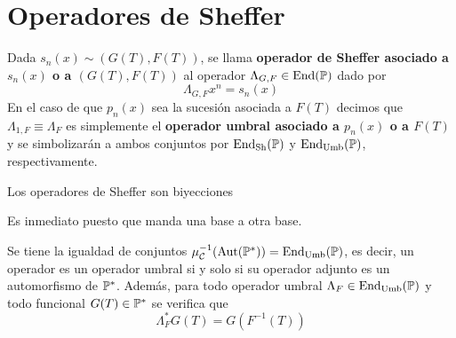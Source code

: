 
\section{Operadores de Sheffer}

\begin{definicion}
    Dada $s_n(x) \sim (G(T), F(T))$, se llama \textbf{operador de Sheffer asociado a $s_n(x)$ o a $(G(T), F(T))$} al operador $\Lambda_{G,F} \in \operatorname*{End}(\mathbb{P})$ dado por
    \begin{equation*}
        \Lambda_{G,F} x^n = s_n(x)
    \end{equation*}
    En el caso de que $p_n(x)$ sea la sucesión asociada a $F(T)$ decimos que $\Lambda_{1, F} \equiv \Lambda_{F}$ es simplemente el \textbf{operador umbral asociado a $p_n(x) $ o a $F(T)$} y se simbolizarán a ambos conjuntos por $\operatorname*{End}_{\mathrm{Sh}}(\mathbb{P})$ y $\operatorname*{End}_{\mathrm{Umb}}(\mathbb{P})$, respectivamente.
\end{definicion}

\begin{proposicion}
    Los operadores de Sheffer son biyecciones
\end{proposicion}

\begin{demo}
        Es inmediato puesto que manda una base a otra base. 
\end{demo}

\begin{teorema}
    Se tiene la igualdad de conjuntos $\mu_{\mathcal{C}}^{-1}(\operatorname*{Aut}(\mathbb{P}^*)) = \operatorname*{End}_{\mathrm{Umb}}(\mathbb{P})$, es decir, un operador es un operador umbral si y solo si su operador adjunto es un automorfismo de $\mathbb{P}^*$. Además, para todo operador umbral $\Lambda_F \in \operatorname*{End}_{\mathrm{Umb}}(\mathbb{P})$ y todo funcional $G(T) \in \mathbb{P}^*$ se verifica que
    \begin{equation*}
        \Lambda_F^*G(T) = G(F^{-1}(T))
    \end{equation*}
\end{teorema}

